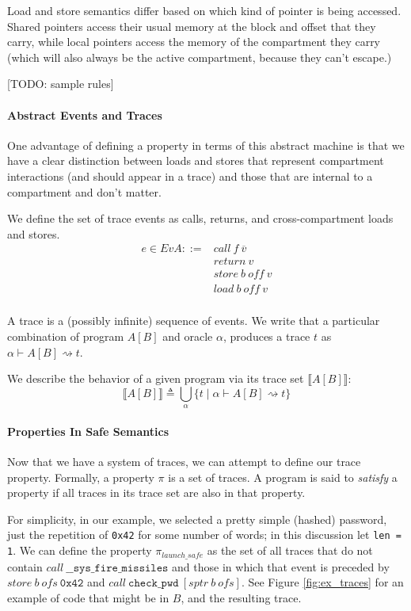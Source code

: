 \documentclass{article}
\begin{document}
Load and store semantics differ based on which kind of pointer is being accessed.
Shared pointers access their usual memory at the block and offset that they carry,
while local pointers access the memory of the compartment they carry (which will also
always be the active compartment, because they can't escape.)

[TODO: sample rules]

\paragraph{Abstract Events and Traces}

One advantage of defining a property in terms of this abstract machine is that we have a clear
distinction between loads and stores that represent compartment interactions (and should appear
in a trace) and those that are internal to a compartment and don't matter.

We define the set of trace events as calls, returns, and cross-compartment loads and stores.
\[\begin{split}
e \in EvA ::= & \mathit{call} ~ f ~ \overline{v} \\
& \mathit{return} ~ v \\
& \mathit{store} ~ b ~ \mathit{off} ~ v \\
& \mathit{load} ~ b ~ \mathit{off} ~ v \\
\end{split}\]

A trace is a (possibly infinite) sequence of events.
We write that a particular combination of program \(A[B]\) and oracle \(\alpha\),
produces a trace \(t\) as \(\alpha \vdash A[B] \rightsquigarrow t\).

We describe the behavior of a given program via its trace set \(\llbracket A[B] \rrbracket\): 
\[\llbracket A[B] \rrbracket \triangleq \bigcup_{\alpha}
\{ t \mid \alpha \vdash A[B] \rightsquigarrow t \}\]

\paragraph{Properties In Safe Semantics}

Now that we have a system of traces, we can attempt to define our trace property.
Formally, a property \(\pi\) is a set of traces. A program is said to {\em satisfy}
a property if all traces in its trace set are also in that property.

For simplicity, in our example, we selected a pretty simple (hashed) password, just
the repetition of {\tt 0x42} for some number of words; in this discussion let {\tt len = 1}.
We can define the property \(\pi_{\mathit{launch\_safe}}\) as the set of all traces
that do not contain \(\mathit{call} ~ \mathtt{\_\_sys\_fire\_missiles}\) and those in which
that event is preceded by \(\mathit{store} ~ b ~ \mathit{ofs} ~ \mathtt{0x42}\)
and \(\mathit{call} ~ \mathtt{check\_pwd} ~ [\mathit{sptr} ~ b ~ \mathit{ofs}]\).
See Figure \ref{fig:ex_traces} for an example of code that might be in \(B\), and the
resulting trace.
\end{document}
